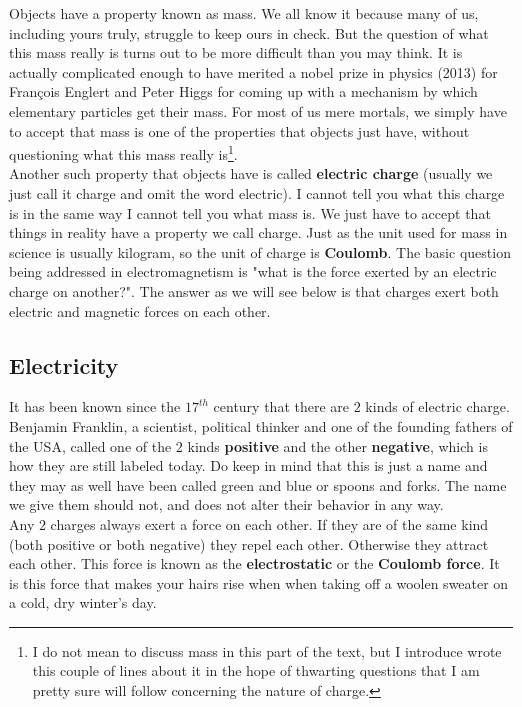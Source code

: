 \noindent Objects have a property known as mass. We all know it because many of us, including yours truly, struggle to keep ours in check. But the question of what this mass really is turns out to be more difficult than you may think. It is actually complicated enough to have merited a nobel prize in physics (2013) for François Englert and Peter Higgs for coming up with a mechanism by which elementary particles get their mass. For most of us mere mortals, we simply have to accept that mass is one of the properties that objects just have, without questioning what this mass really is\footnote{I do not mean to discuss mass in this part of the text, but I introduce wrote this couple of lines about it in the hope of thwarting questions that I am pretty sure will follow concerning the nature of charge.}.\\

\noindent Another such property that objects have is called \textbf{electric charge} (usually we just call it charge and omit the word electric). I cannot tell you what this charge is in the same way I cannot tell you what mass is. We just have to accept that things in reality have a property we call charge. Just as the unit used for mass in science is usually kilogram, so the unit of charge is \textbf{Coulomb}. The basic question being addressed in electromagnetism is "what is the force exerted by an electric charge on another?". The answer as we will see below is that charges exert both electric and magnetic forces on each other.

\subsection{Electricity}

\noindent It has been known since the $17^{th}$ century that there are $2$ kinds of electric charge. Benjamin Franklin, a scientist, political thinker and one of the founding fathers of the USA, called one of the $2$ kinds \textbf{positive} and the other \textbf{negative}, which is how they are still labeled today. Do keep in mind that this is just a name and they may as well have been called green and blue or spoons and forks. The name we give them should not, and does not alter their behavior in any way.\\

\noindent Any $2$ charges always exert a force on each other. If they are of the same kind (both positive or both negative) they repel each other. Otherwise they attract each other. This force is known as the \textbf{electrostatic} or the \textbf{Coulomb force}. It is this force that makes your hairs rise when when taking off a woolen sweater on a cold, dry winter's day.

